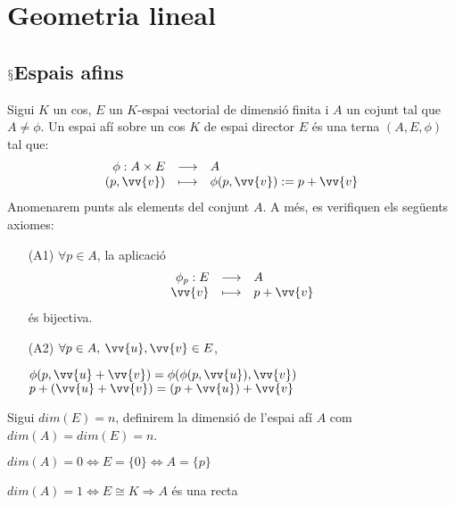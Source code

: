 \chapter{Geometria lineal}

\section{$\mathsection$Espais afins}
\label{ea}

\begin{defn}
	Sigui $K$ un cos, $E$ un $K$-espai vectorial de dimensió finita i $A$ un cojunt tal que $A\neq\phi$. Un espai afí sobre un cos $K$ de espai director $E$ és una terna $(A,E,\phi)$ tal que:
	$$\begin{array}{rcl}
		\phi :A\times E	& \longrightarrow	& A 				\\
		(p,\vv{v})	& \longmapsto		& \phi (p,\vv{v}):=p+\vv{v}	\\
	\end{array}$$
	Anomenarem punts als elements del conjunt $A$. A més, es verifiquen els següents axiomes:
	\begin{itemize}
		\item[(A1)] $\forall p\in A$, la aplicació
		$$\begin{array}{rcl}
			\phi_{p} :E	& \longrightarrow	& A 		\\
			\vv{v}		& \longmapsto		& p+\vv{v}	\\
		\end{array}$$
		és bijectiva.
		\item[(A2)] $\forall p\in A,\: \vv{u},\vv{v}\in E$,
		\begin{center}
			$\phi (p,\vv{u}+\vv{v})=\phi (\phi (p,\vv{u}),\vv{v})$ \\
			$p+(\vv{u}+\vv{v})=(p+\vv{u})+\vv{v}$
		\end{center}
	\end{itemize}
	Sigui $dim(E)=n$, definirem la dimensió de l'espai afí $A$ com $dim(A)=dim(E)=n$.
\end{defn}

\begin{exmp}
	$dim(A)=0\Leftrightarrow E=\{ 0\}\Leftrightarrow A=\{ p\}$
\end{exmp}
\begin{exmp}
	$dim(A)=1\Leftrightarrow E\cong K\Rightarrow A$ és una recta	
\end{exmp}

